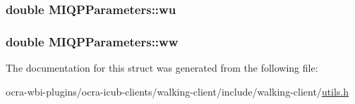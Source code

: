 \hypertarget{structMIQPParameters_aed141afdcc25904d53526a5f2c977427}{
\subsubsection[{wu}]{\setlength{\rightskip}{0pt plus 5cm}double {\bf \-M\-I\-Q\-P\-Parameters\-::wu}}}\label{structMIQPParameters_aed141afdcc25904d53526a5f2c977427}
\hypertarget{structMIQPParameters_a7223a1cda1e4565d18729f1e7bba87e0}{
\subsubsection[{ww}]{\setlength{\rightskip}{0pt plus 5cm}double {\bf \-M\-I\-Q\-P\-Parameters\-::ww}}}\label{structMIQPParameters_a7223a1cda1e4565d18729f1e7bba87e0}


\-The documentation for this struct was generated from the following file\-:\begin{DoxyCompactItemize}
\item 
ocra-\/wbi-\/plugins/ocra-\/icub-\/clients/walking-\/client/include/walking-\/client/\hyperlink{utils_8h}{utils.\-h}\end{DoxyCompactItemize}
